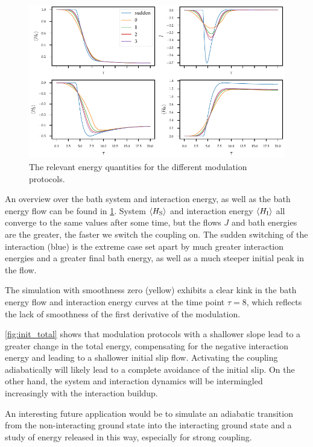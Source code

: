 \begin{figure}[htp]
  \centering
  \includegraphics{figs/one_bath_mod/init_overview}
  \caption{\label{fig:init_energies}The relevant energy quantities for
    the different modulation protocols.}
\end{figure}
An overview over the bath system and interaction energy, as well as
the bath energy flow can be found in \cref{fig:init_energies}. System
\(\ev{H_{\sys}}\) and interaction energy \(\ev{H_{\inter}}\) all
converge to the same values after some time, but the flows \(J\) and
bath energies are the greater, the faster we switch the coupling
on. The sudden switching of the interaction (blue) is the extreme case
set apart by much greater interaction energies and a greater final
bath energy, as well as a much steeper initial peak in the flow.

The simulation with smoothness zero (yellow) exhibits a clear kink in
the bath energy flow and interaction energy curves at the time point
\(τ=8\), which reflects the lack of smoothness of the first derivative
of the modulation.

\cref{fig:init_total} shows that modulation protocols with a shallower
slope lead to a greater change in the total energy, compensating for
the negative interaction energy and leading to a shallower initial
slip flow. Activating the coupling adiabatically will likely lead to a
complete avoidance of the initial slip. On the other hand, the system
and interaction dynamics will be intermingled increasingly with the
interaction buildup.

An interesting future application would be to simulate an adiabatic
transition from the non-interacting ground state into the interacting
ground state and a study of energy released in this way, especially
for strong coupling.

